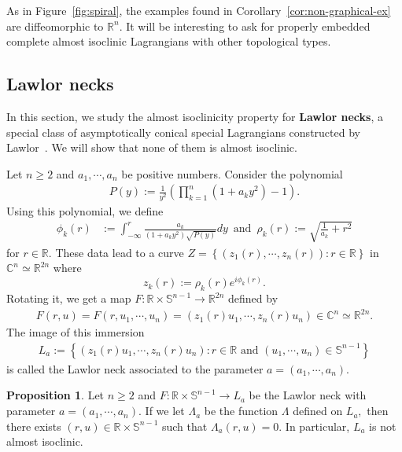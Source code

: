 \documentclass[11pt]{amsart}
\numberwithin{equation}{section}
\theoremstyle{definition}
\theoremstyle{definition}
\newtheorem{prop}[equation]{Proposition} %
\newcommand{\set}[1]{\left\{#1\right\}}
\newcommand{\pr}[1]{\left(#1\right)}
\newcommand{\bb}[1]{\mathbb{#1}} \newcommand{\td}[1]{\widetilde{#1}}
\begin{document}
As in Figure~\ref{fig:spiral}, the examples found in Corollary~\ref{cor:non-graphical-ex} are diffeomorphic to $\bb R^n.$
It will be interesting to ask for properly embedded complete almost isoclinic Lagrangians with other topological types.



\subsection{Lawlor necks}
\label{sec:Lawlor-neck}


In this section, we study the almost isoclinicity property for {\bf Lawlor necks}, a special class of asymptotically conical special Lagrangians constructed by Lawlor~\cite{L89}.
We will show that none of them is almost isoclinic.


Let $n\ge 2$ and $a_1,\cdots,a_n$ be positive numbers.
Consider the polynomial
\begin{align*}
P(y)
:= \frac 1{y^2}\pr{\prod_{k=1}^n(1+a_ky^2)-1}.
\end{align*}
Using this polynomial, we define
\begin{align*}
\phi_k(r)
&:= \int_{-\infty}^r \frac{a_k}{\pr{1+a_ky^2}\sqrt{P(y)}}dy\,
\text{ and }\,
\rho_k(r)
:= \sqrt{\frac 1{a_k} + r^2}
\end{align*}
for $r\in\bb R.$
These data lead to a curve $Z=\set{\pr{z_1(r),\cdots,z_n(r)}:r\in\bb R}$ in $\bb C^n\simeq \bb R^{2n}$ where 
$$z_k(r) := \rho_k(r) e^{i\phi_k(r)}.$$
Rotating it, we get a map $F\colon \bb R\times \mathbb S^{n-1}\to\bb R^{2n}$ defined by
\begin{align*}
F(r,u)
= F(r,u_1,\cdots,u_n)
= \pr{z_1(r)u_1,\cdots,z_n(r)u_n}
\in \bb C^n\simeq \bb R^{2n}.
\end{align*}
The image of this immersion
\begin{align*}
L_a
:=\set{\pr{z_1(r)u_1,\cdots,z_n(r)u_n}: r\in\bb R\text{ and }(u_1,\cdots,u_n)\in \mathbb S^{n-1}}
\end{align*} 
is called the Lawlor neck associated to the parameter $a=(a_1,\cdots,a_n).$



\begin{prop}
	\label{prop:L-not-AI-n>2}
	Let $n\ge 2$ and $F\colon \bb R\times \mathbb S^{n-1}\to L_a$ be the Lawlor neck with parameter $a=(a_1,\cdots,a_n).$
	If we let $\Lambda_a$ be the function $\Lambda$ defined on $L_a,$ then there exists $(r,u)\in \bb R\times \mathbb S^{n-1}$ such that $\Lambda_a(r,u)=0.$
	In particular, $L_a$ is not almost isoclinic.
\end{prop}
\end{document}
